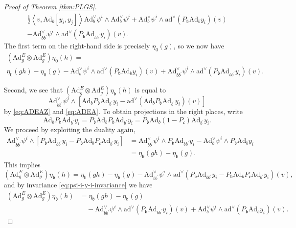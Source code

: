 \documentclass[a4paper,11pt]{amsart}
\newcommand{\fr}[1]{\mathfrak{#1}}
\newcommand{\ox}{\otimes}
\newcommand{\pr}{\prime}
\newcommand{\Ad}{\mathrm{Ad}}
\newcommand{\ad}{\mathrm{ad}}
\theoremstyle{definition}
\theoremstyle{remark}
\begin{document}
\begin{proof}[Proof of Theorem \ref{thm:PLGS}]
\begin{multline*}
 \frac{1}{2} \left\langle v , \Ad_b \mathopen{} \left[ y_i , y_j \right] \right\rangle \Ad^\vee_b \psi^i \wedge \Ad^\vee_b \psi^j + \Ad^\vee_b \psi^i \wedge \ad^\vee ( P_{\fr{b}} \Ad_b y_i ) (v)\\
  - \Ad^\vee_{b b^\pr} \psi^i \wedge \ad^\vee ( P_{\fr{b}} \Ad_{b b^\pr} y_i ) (v) .
\end{multline*}
The first term on the right-hand side is precisely $\eta_0(g)$, so we now have
\begin{multline}\label{eq:g-on-eta-0-h}
\left( \Ad^{E}_g \ox \Ad^{E}_g \right) \eta_0(h) =\\
 \eta_0(g h) - \eta_0(g) - \Ad^\vee_b \psi^i \wedge \ad^\vee ( P_{\fr{b}} \Ad_b y_i ) (v) + \Ad^\vee_{b b^\pr} \psi^i \wedge \ad^\vee ( P_{\fr{b}} \Ad_{b b^\pr} y_i ) (v) .
\end{multline}

Second, we see that $\left( \Ad^{E}_g \ox \Ad^{E}_g \right) \eta_{\fr{b}}(h) $ is equal to
\[
\Ad^\vee_{b b^\pr} \psi^i \wedge \left[ \Ad_b P_{\fr{b}} \Ad_{b^\pr} y_i - \ad^\vee ( \Ad_b P_{\fr{b}} \Ad_{b^\pr} y_i ) (v) \right]
\]
by \eqref{eq:ADEAZ} and \eqref{eq:ADEA}.
To obtain projections in the right places, write
\[
\Ad_b P_{\fr{b}} \Ad_{b^\pr} y_i = P_{\fr{b}} \Ad_b P_{\fr{b}} \Ad_{b^\pr} y_i = P_{\fr{b}} \Ad_b \mathopen{} \left( 1 - P_{\fr{c}} \right) \Ad_{b^\pr} y_i .
\]
We proceed by exploiting the duality again,
\[
\begin{split}
\Ad^\vee_{b b^\pr} \psi^i \wedge \left[ P_{\fr{b}} \Ad_{b b^\pr} y_i - P_{\fr{b}} \Ad_b P_{\fr{c}} \Ad_{b^\pr} y_i \right] &= \Ad^\vee_{b b^\pr} \psi^i \wedge P_{\fr{b}} \Ad_{b b^\pr} y_i - \Ad^\vee_b \psi^i \wedge P_{\fr{b}} \Ad_b y_i \\
&= \eta_{\fr{b}}(g h) - \eta_{\fr{b}}(g) .
\end{split}
\]
This implies
\[
\left( \Ad^{E}_g \ox \Ad^{E}_g \right) \eta_{\fr{b}}(h) = \eta_{\fr{b}}(g h) - \eta_{\fr{b}}(g) - \Ad^\vee_{b b^\pr} \psi^i \wedge \ad^\vee ( P_{\fr{b}} \Ad_{b b^\pr} y_i - P_{\fr{b}} \Ad_b P_{\fr{c}} \Ad_{b^\pr} y_i ) (v),
\]
and by invariance \eqref{eq:psi-i-y-i-invariance} we have
\begin{equation}\label{eq:g-on-eta-b-h}
\begin{split}
\left( \Ad^{E}_g \ox \Ad^{E}_g \right) \eta_{\fr{b}}(h)
&= \eta_{\fr{b}}(g h) - \eta_{\fr{b}}(g) \\
&\quad - \Ad^\vee_{b b^\pr} \psi^i \wedge \ad^\vee ( P_{\fr{b}} \Ad_{b b^\pr} y_i ) (v) + \Ad^\vee_b \psi^i \wedge \ad^\vee ( P_{\fr{b}} \Ad_b y_i ) (v) .
\end{split}
\end{equation}


\end{proof}
\end{document}
